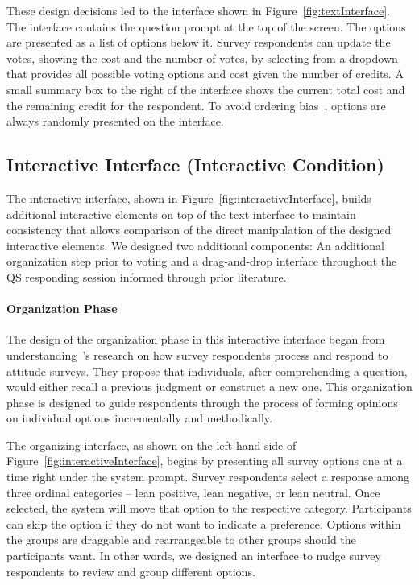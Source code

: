 These design decisions led to the interface shown in Figure~\ref{fig:textInterface}. The interface contains the question prompt at the top of the screen. The options are presented as a list of options below it. Survey respondents can update the votes, showing the cost and the number of votes, by selecting from a dropdown that provides all possible voting options and cost given the number of credits. A small summary box to the right of the interface shows the current total cost and the remaining credit for the respondent. To avoid ordering bias~\cite{ferberOrderBiasMail1952, couperWebSurveyDesign2001}, options are always randomly presented on the interface.

\subsection{Interactive Interface (Interactive Condition)}
The interactive interface, shown in Figure~\ref{fig:interactiveInterface}, builds additional interactive elements on top of the text interface to maintain consistency that allows comparison of the direct manipulation of the designed interactive elements. We designed two additional components: An additional organization step prior to voting and a drag-and-drop interface throughout the QS responding session informed through prior literature.

\paragraph{Organization Phase}

The design of the organization phase in this interactive interface began from understanding~\textcite{strackThinkingJudgingCommunicating1987}'s research on how survey respondents process and respond to attitude surveys. They propose that individuals, after comprehending a question, would either recall a previous judgment or construct a new one. This organization phase is designed to guide respondents through the process of forming opinions on individual options incrementally and methodically.

The organizing interface, as shown on the left-hand side of Figure~\ref{fig:interactiveInterface}, begins by presenting all survey options one at a time right under the system prompt. Survey respondents select a response among three ordinal categories -- lean positive, lean negative, or lean neutral. Once selected, the system will move that option to the respective category. Participants can skip the option if they do not want to indicate a preference. Options within the groups are draggable and rearrangeable to other groups should the participants want. In other words, we designed an interface to nudge survey respondents to review and group different options.


